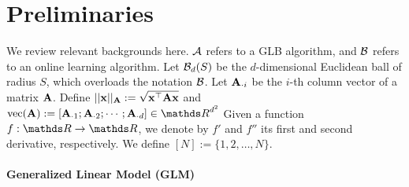 \vspace{-4pt}
\section{Preliminaries}
\label{sec:prelim}
\vspace{-4pt}

We review relevant backgrounds here.  
$\mathcal{A}$ refers to a GLB algorithm, and $\mathcal{B}$ refers to an online learning algorithm.
Let $\mathcal{B}_d(S)$ be the $d$-dimensional Euclidean ball of radius $S$, which overloads the notation $\mathcal{B}$. %
Let $\mathbf{A}_{\cdot i}$ be the $i$-th column vector of a matrix $\mathbf{A}$.
Define $||\mathbf{x} ||_{\mathbf{A}} := \sqrt{\mathbf{x}^{\top}\mathbf{A}\mathbf{x}}$ and $\vec(\A) := [\A_{\cdot 1}; \A_{\cdot 2}; \cdots ; \A_{\cdot d} ] \in \dsR^{d^2}$
Given a function $f:\dsR\rarrow\dsR$, we denote by $f'$ and $f''$ its first and second derivative, respectively.
We define $[N] := \{1,2,\ldots,N\}$.

\vspace{-4pt}
\paragraph{Generalized Linear Model (GLM)}

